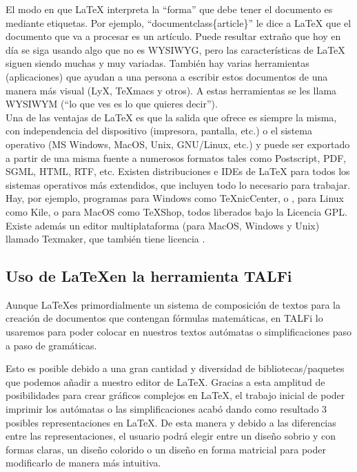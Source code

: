 \documentclass[12pt,a4paper,spanish]{book}
\begin{document}
El modo en que \LaTeX{} interpreta la ``forma'' que debe tener el documento es mediante etiquetas. Por ejemplo, ``documentclass\{article\}'' le dice a \LaTeX{} que el documento que va a procesar es un art\'iculo. Puede resultar extra\~no que hoy en d\'ia se siga usando algo que no es WYSIWYG, pero las caracter\'isticas de \LaTeX{} siguen siendo muchas y muy variadas. Tambi\'en hay varias herramientas (aplicaciones) que ayudan a una persona a escribir estos documentos de una manera m\'as visual (LyX, TeXmacs y otros). A estas herramientas se les llama WYSIWYM (``lo que ves es lo que quieres decir'').\\
\newpage
Una de las ventajas de \LaTeX{} es que la salida que ofrece es siempre la misma, con independencia del dispositivo (impresora, pantalla, etc.) o el sistema operativo (MS Windows, MacOS, Unix, GNU/Linux, etc.) y puede ser exportado a partir de una misma fuente a numerosos formatos tales como Postscript, PDF, SGML, HTML, RTF, etc. Existen distribuciones e IDEs de LaTeX para todos los sistemas operativos m\'as extendidos, que incluyen todo lo necesario para trabajar. Hay, por ejemplo, programas para Windows como TeXnicCenter,  o , para Linux como Kile, o para MacOS como TeXShop, todos liberados bajo la Licencia GPL. Existe adem\'as un editor multiplataforma (para MacOS, Windows y Unix) llamado Texmaker, que tambi\'en tiene licencia .

\subsection{Uso de \LaTeX en la herramienta TALFi}
Aunque \LaTeX es primordialmente un sistema de composici\'on de textos para la creaci\'on de documentos que contengan f\'ormulas matem\'aticas, en TALFi lo usaremos para poder colocar en nuestros textos aut\'omatas o simplificaciones paso a paso de gram\'aticas.

Esto es posible debido a una gran cantidad y diversidad de bibliotecas/paquetes que podemos a\~nadir a nuestro editor de \LaTeX{}.
Gracias a esta amplitud de posibilidades para crear gr\'aficos complejos en \LaTeX{}, el trabajo inicial de poder imprimir los aut\'omatas o las simplificaciones acab\'o dando como resultado 3 posibles representaciones en \LaTeX{}. De esta manera y debido a las diferencias entre las representaciones, el usuario podr\'a elegir entre un dise\~no sobrio y con formas claras, un dise\~no colorido o un dise\~no en forma matricial para poder modificarlo de manera m\'as intuitiva.
\end{document}
